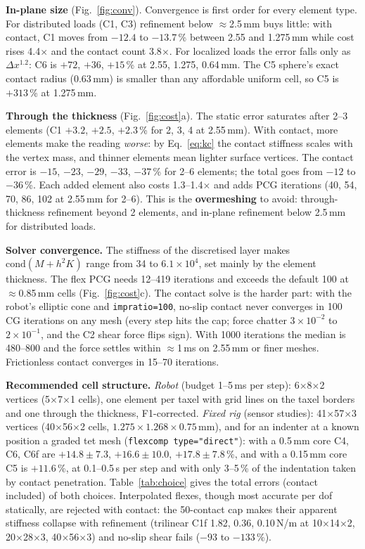 \documentclass[10pt,twocolumn]{article}
\newcommand{\code}[1]{\texttt{\small #1}}
\newcommand{\Nu}{N/\textmu m}
\begin{document}
\textbf{In-plane size} (Fig.~\ref{fig:conv}). Convergence is first order for every element type. For distributed
loads (C1, C3) refinement below $\approx$2.5\,mm buys little: with contact, C1 moves from $-12.4$ to $-13.7$\,\% between
2.55 and 1.275\,mm while cost rises 4.4$\times$ and the contact count 3.8$\times$. For localized loads the error
falls only as $\Delta x^{1.2}$: C6 is $+72$, $+36$, $+15$\,\% at 2.55, 1.275, 0.64\,mm. The C5 sphere's exact contact
radius (0.63\,mm) is smaller than any affordable uniform cell, so C5 is $+313$\,\% at 1.275\,mm.

\textbf{Through the thickness} (Fig.~\ref{fig:cost}a). The static error saturates after 2--3 elements (C1 $+3.2$,
$+2.5$, $+2.3$\,\% for 2, 3, 4 at 2.55\,mm). With contact, more elements make the reading \emph{worse}: by
Eq.~\eqref{eq:kc} the contact stiffness scales with the vertex mass, and thinner elements mean lighter surface vertices.
The contact error is $-15$, $-23$, $-29$, $-33$, $-37$\,\% for 2--6 elements; the total goes from $-12$ to $-36$\,\%.
Each added element also costs 1.3--1.4$\times$ and adds PCG iterations (40, 54, 70, 86, 102 at 2.55\,mm for 2--6).
This is the \textbf{overmeshing} to avoid: through-thickness refinement beyond 2 elements, and in-plane refinement
below 2.5\,mm for distributed loads.

\textbf{Solver convergence.} The stiffness of the discretised layer makes $\mathrm{cond}(M+h^2K)$ range from 34 to
$6.1\times10^4$, set mainly by the element thickness. The flex PCG needs 12--419 iterations and exceeds the default 100
at $\approx$0.85\,mm cells (Fig.~\ref{fig:cost}c). The contact solve is the harder part: with the robot's elliptic cone
and \code{impratio=100}, no-slip contact never converges in 100 CG iterations on any mesh (every step hits the cap;
force chatter $3\times10^{-2}$ to $2\times10^{-1}$, and the C2 shear force flips sign). With 1000 iterations the median
is 480--800 and the force settles within $\approx$1\,ms on 2.55\,mm or finer meshes. Frictionless contact converges in
15--70 iterations.

\textbf{Recommended cell structure.} \emph{Robot} (budget 1--5\,ms per step): 6$\times$8$\times$2 vertices
(5$\times$7$\times$1 cells), one element per taxel with grid lines on the taxel borders and one through the thickness,
F1-corrected. \emph{Fixed rig} (sensor studies): 41$\times$57$\times$3 vertices (40$\times$56$\times$2 cells,
$1.275\times1.268\times0.75$\,mm), and for an indenter at a known position a graded tet mesh
(\code{flexcomp type="direct"}): with a 0.5\,mm core C4, C6, C6f are $+14.8\pm7.3$, $+16.6\pm10.0$, $+17.8\pm7.8$\,\%,
and with a 0.15\,mm core C5 is $+11.6$\,\%, at 0.1--0.5\,s per step and with only 3--5\,\% of the indentation taken by
contact penetration. Table~\ref{tab:choice} gives the total errors (contact included) of both choices. Interpolated
flexes, though most accurate per dof statically, are rejected with contact: the 50-contact cap makes their apparent
stiffness collapse with refinement (trilinear C1f 1.82, 0.36, 0.10\,\Nu{} at 10$\times$14$\times$2, 20$\times$28$\times$3,
40$\times$56$\times$3) and no-slip shear fails ($-93$ to $-133$\,\%).
\end{document}

